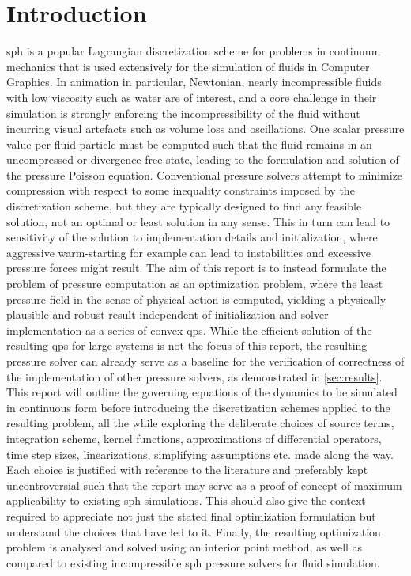 \documentclass[conference]{IEEEtran}
\begin{document}
\section{Introduction}
\ac{sph} is a popular Lagrangian discretization scheme for problems in continuum mechanics that is used extensively for the simulation of fluids in Computer Graphics. In animation in particular, Newtonian, nearly incompressible fluids with low viscosity such as water are of interest, and a core challenge in their simulation is strongly enforcing the incompressibility of the fluid without incurring visual artefacts such as volume loss and oscillations. One scalar pressure value per fluid particle must be computed such that the fluid remains in an uncompressed or divergence-free state, leading to the formulation and solution of the pressure Poisson equation. Conventional pressure solvers attempt to minimize compression with respect to some inequality constraints imposed by the discretization scheme, but they are typically designed to find any feasible solution, not an optimal or least solution in any sense. This in turn can lead to sensitivity of the solution to implementation details and initialization, where aggressive warm-starting for example can lead to instabilities and excessive pressure forces might result. The aim of this report is to instead formulate the problem of pressure computation as an optimization problem, where the least pressure field in the sense of physical action is computed, yielding a physically plausible and robust result independent of initialization and solver implementation as a series of convex \ac{qps}. While the efficient solution of the resulting \ac{qps} for large systems is not the focus of this report, the resulting pressure solver can already serve as a baseline for the verification of correctness of the implementation of other pressure solvers, as demonstrated in \autoref{sec:results}.\\

This report will outline the governing equations of the dynamics to be simulated in continuous form before introducing the discretization schemes applied to the resulting problem, all the while exploring the deliberate choices of source terms, integration scheme, kernel functions, approximations of differential operators, time step sizes, linearizations, simplifying assumptions etc. made along the way. Each choice is justified with reference to the literature and preferably kept uncontroversial such that the report may serve as a proof of concept of maximum applicability to existing \ac{sph} simulations. This should also give the context required to appreciate not just the stated final optimization formulation but understand the choices that have led to it. Finally, the resulting optimization problem is analysed and solved using an interior point method, as well as compared to existing incompressible \ac{sph} pressure solvers for fluid simulation.
\end{document}
